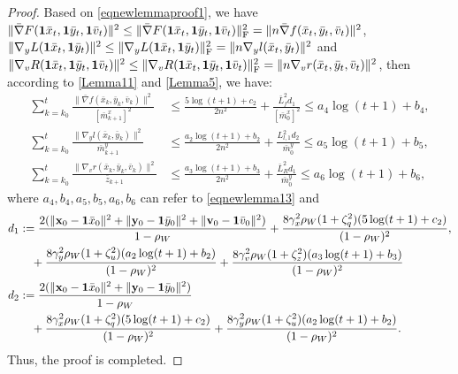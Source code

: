 \documentclass{article}
\theoremstyle{plain}
\theoremstyle{definition}
\theoremstyle{remark}
\begin{document}
\begin{proof}
Based on \cref{eqnewlemmaproof1}, we have $\|\bar{\nabla} F(\mathbf{1}\bar{x}_t, \mathbf{1}\bar{y}_t, \mathbf{1}\bar{v}_t)\|^2 \leq\|\bar{\nabla} F(\mathbf{1}\bar{x}_t, \mathbf{1}\bar{y}_t, \mathbf{1}\bar{v}_t)\|_{\rm F}^2=\|n\bar{\nabla} f(\bar{x}_t,\bar{y}_t,\bar{v}_t)\|^2$, $\|\nabla_y L(\mathbf{1}\bar{x}_t, \mathbf{1}\bar{y}_t)\|^2\leq\|\nabla_y L(\mathbf{1}\bar{x}_t, \mathbf{1}\bar{y}_t)\|_{\rm F}^2=\|n\nabla_y l(\bar{x}_t, \bar{y}_t)\|^2$ and $\|\nabla_v R(\mathbf{1}\bar{x}_t, \mathbf{1}\bar{y}_t, \mathbf{1}\bar{v}_t)\|^2\leq\|\nabla_v R(\mathbf{1}\bar{x}_t, \mathbf{1}\bar{y}_t, \mathbf{1}\bar{v}_t)\|_{\rm F}^2=\|n\nabla_v r(\bar{x}_t, \bar{y}_t, \bar{v}_t)\|^2$, then according to \cref{Lemma11} and \cref{Lemma5}, we have:
\begin{align}
\sum_{k=k_0}^t \frac{\|\bar{\nabla} f(\bar{x}_k,\bar{y}_k,\bar{v}_k)\|^2}{[\bar{m}^x_{k+1}]^2} &\leq \frac{5\log(t + 1)+c_2}{2n^2} + \frac{\bar{L}_{f}^2d_1}{[\bar{m}^x_0]^2}\leq{a_4\log(t + 1)+b_4},\nonumber\\
\sum_{k=k_0}^t \frac{\|\nabla_y l(\bar{x}_k, \bar{y}_k)\|^2}{\bar{m}^y_{k+1}} &\leq \frac{a_2 \log(t + 1)+b_2}{2n^2} + \frac{L_{l,1}^2d_2}{\bar{m}^y_0}\leq {a_5 \log(t + 1)+b_5}, \nonumber\\
\sum_{k=k_0}^t \frac{\|\nabla_v r(\bar{x}_k, \bar{y}_k, \bar{v}_k)\|^2}{\bar{z}_{k+1}} &\leq \frac{a_3 \log(t + 1) + b_3}{2n^2}+\frac{\bar{L}_{R}^2d_1}{\bar{m}^y_0}\leq {a_6 \log(t + 1) + b_6},\label{eq124}
\end{align}
where $a_4, b_4, a_5, b_5, a_6, b_6$ can refer to \cref{eqnewlemma13} and 
\begin{align}
d_1&:=\frac{2 (\|\mathbf{x}_{0} - \mathbf{1} \bar{x}_{0} \|^2+\|\mathbf{y}_{0} - \mathbf{1} \bar{y}_{0} \|^2+\|\mathbf{v}_{0} - \mathbf{1} \bar{v}_{0} \|^2)}{1 - \rho_W}  
+ \frac{8 \gamma_x^2 \rho_W (1 + \zeta_q^2)( 5 \log(t + 1) + c_2)}{(1 - \rho_W)^2 }, \nonumber \\
&\quad + \frac{8 \gamma_y^2 \rho_W (1 + \zeta_u^2)(a_2 \log(t + 1) + b_2)}{(1 - \rho_W)^2}+\frac{8 \gamma_v^2 \rho_W (1 + \zeta_z^2)(a_3 \log(t + 1) + b_3)}{(1 - \rho_W)^2}\nonumber\\
d_2&:=\frac{2 (\|\mathbf{x}_{0} - \mathbf{1} \bar{x}_{0} \|^2+\|\mathbf{y}_{0} - \mathbf{1} \bar{y}_{0} \|^2)}{1 - \rho_W} \notag\\
&\quad+ \frac{8 \gamma_x^2 \rho_W (1 + \zeta_q^2)( 5 \log(t + 1) + c_2)}{(1 - \rho_W)^2} + \frac{8 \gamma_y^2 \rho_W (1 + \zeta_u^2)(a_2 \log(t + 1) + b_2)}{(1 - \rho_W)^2}.
\label{eq125}
\end{align}
Thus, the proof is completed.
\end{proof}
\end{document}
